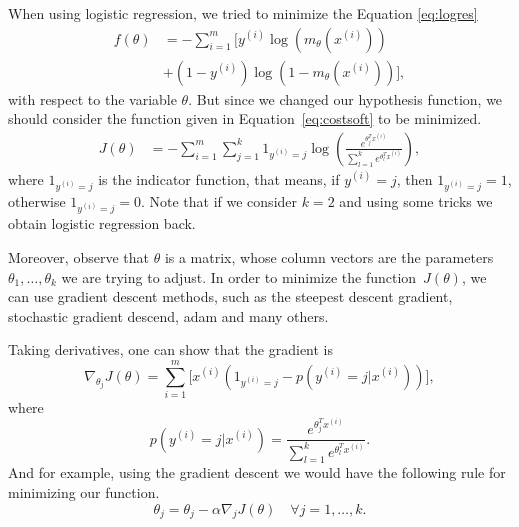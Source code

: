 \documentclass{article}
\begin{document}
  When using logistic regression, we tried to minimize the Equation \eqref{eq:logres}
  \begin{equation}\label{eq:logres}
    \begin{split}
      f(\theta) &= -\sum_{i=1}^{m} \Big[ y^{(i)}\log\left(m_\theta(x^{(i)})\right) \\
      &+ (1-y^{(i)}) \log\left(1-m_\theta(x^{(i)})\right) \Big],
    \end{split}
  \end{equation}
  with respect to the variable $\theta$. But since we changed our hypothesis function,
  we should consider the function given in Equation~\eqref{eq:costsoft} to be
  minimized.
  \begin{equation}\label{eq:costsoft}
    \begin{split}
      J(\theta) &= -\sum_{i=1}^{m} \sum_{j=1}^{k} 1_{y^{(i)}=j}
      \log \left( \frac{e^{\theta_j^T x^{(i)}}}{\sum_{l=1}^{k}e^{
      \theta_l^T x^{(i)}}} \right),
    \end{split}
  \end{equation}
  where $1_{y^{(i)}=j}$ is the indicator function, that means, if $y^{(i)} = j$,
  then $1_{y^{(i)}=j} = 1$, otherwise $1_{y^{(i)}=j}=0$. Note that if we
  consider $k=2$ and using some tricks we obtain logistic regression
  back.

  Moreover, observe that $\theta$ is a matrix, whose column vectors are the
  parameters $\theta_1,\dots,\theta_k$ we are trying to adjust. In order
  to minimize the function~$J(\theta)$, we can use gradient descent methods, such
  as the steepest descent gradient, stochastic gradient descend, adam and
  many others.

  Taking derivatives, one can show that the gradient is
  \begin{equation}
    \nabla_{\theta_j} J(\theta) = \sum_{i=1}^{m}\Big[ x^{(i)}\left(
      1_{y^{(i)}=j} - p(y^{(i)}=j|x^{(i)})
    \right) \Big],
  \end{equation}
  where
  \begin{equation*}
    p(y^{(i)}=j|x^{(i)}) = \frac{e^{\theta_j^T x^{(i)
    }}}{\sum_{l=1}^{k}e^{\theta_l^T x^{(i)}}}.
  \end{equation*}
  And for example, using the gradient descent we would have the following
  rule for minimizing our function.
  \begin{equation*}
    \theta_j = \theta_j - \alpha \nabla_j J(\theta) \quad \forall j=1,\dots,k.
  \end{equation*}
\end{document}
